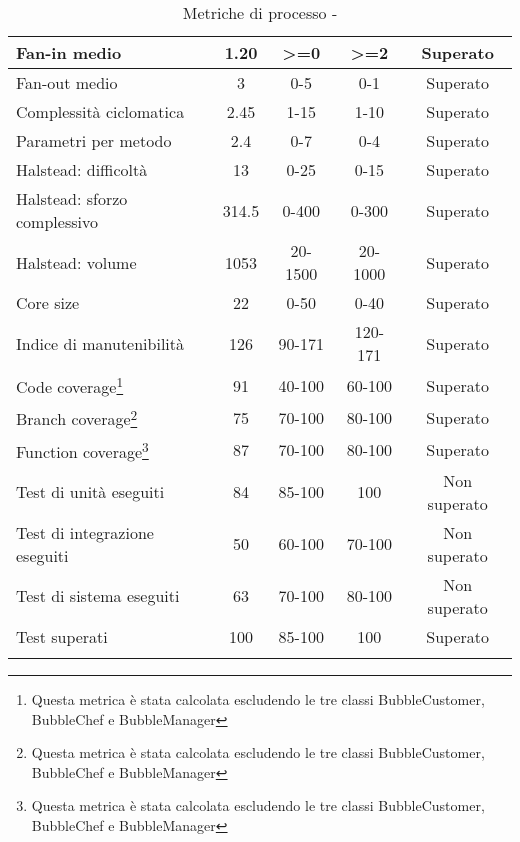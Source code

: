 \begin{longtable}{|m{5cm}|c|c|c|c|}
	\hline Fan-in medio & 1.20 & >=0 & >=2 & Superato \\
	\hline Fan-out medio & 3 & 0-5 & 0-1 & Superato \\
	\hline Complessità ciclomatica & 2.45 & 1-15 & 1-10 & Superato \\
	\hline Parametri per metodo & 2.4 & 0-7 & 0-4 & Superato \\
	\hline Halstead: difficoltà & 13 & 0-25 & 0-15 & Superato \\
	\hline Halstead: sforzo complessivo & 314.5 & 0-400 & 0-300 & Superato\\
	\hline Halstead: volume & 1053 & 20-1500 & 20-1000 & Superato \\
	\hline Core size & 22 & 0-50 & 0-40 & Superato \\
	\hline Indice di manutenibilità & 126 & 90-171 & 120-171 & Superato \\
	\hline Code coverage\footnote{Questa metrica è stata calcolata escludendo le tre classi BubbleCustomer, BubbleChef e BubbleManager} & 91 & 40-100 & 60-100 & Superato \\
	\hline Branch coverage\footnote{Questa metrica è stata calcolata escludendo le tre classi BubbleCustomer, BubbleChef e BubbleManager} & 75 & 70-100 & 80-100 & Superato \\
	\hline Function coverage\footnote{Questa metrica è stata calcolata escludendo le tre classi BubbleCustomer, BubbleChef e BubbleManager} & 87 & 70-100 & 80-100 & Superato \\
	\hline Test di unità eseguiti & 84 & 85-100 & 100 & Non superato \\
	\hline Test di integrazione eseguiti & 50 & 60-100 & 70-100 & Non superato \\
	\hline Test di sistema eseguiti & 63 & 70-100 & 80-100 & Non superato \\
	\hline Test superati & 100 & 85-100 & 100 & Superato \\
	\hline
	\caption{Metriche di processo - \RQ{}}
\end{longtable}

